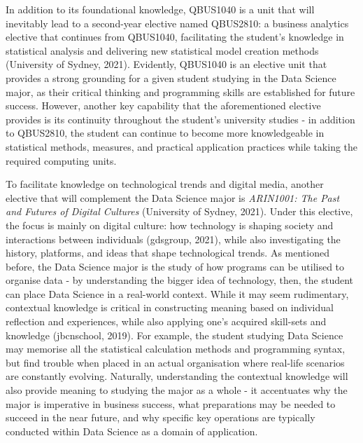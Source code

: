 In addition to its foundational knowledge, QBUS1040 is a unit that will inevitably lead to a second-year elective named QBUS2810: a business analytics elective that continues from QBUS1040, facilitating the student’s knowledge in statistical analysis and delivering new statistical model creation methods (University of Sydney, 2021). Evidently, QBUS1040 is an elective unit that provides a strong grounding for a given student studying in the Data Science major, as their critical thinking and programming skills are established for future success. However, another key capability that the aforementioned elective provides is its continuity throughout the student’s university studies - in addition to QBUS2810, the student can continue to become more knowledgeable in statistical methods, measures, and practical application practices while taking the required computing units. 


To facilitate knowledge on technological trends and digital media, another elective that will complement the Data Science major is \textit{ARIN1001: The Past and Futures of Digital Cultures} (University of Sydney, 2021). Under this elective, the focus is mainly on digital culture: how technology is shaping society and interactions between individuals (gdsgroup, 2021), while also investigating the history, platforms, and ideas that shape technological trends. As mentioned before, the Data Science major is the study of how programs can be utilised to organise data - by understanding the bigger idea of technology, then, the student can place Data Science in a real-world context. While it may seem rudimentary, contextual knowledge is critical in constructing meaning based on individual reflection and experiences, while also applying one’s acquired skill-sets and knowledge (jbcnschool, 2019). For example, the student studying Data Science may memorise all the statistical calculation methods and programming syntax, but find trouble when placed in an actual organisation where real-life scenarios are constantly evolving. Naturally, understanding the contextual knowledge will also provide meaning to studying the major as a whole - it accentuates why the major is imperative in business success, what preparations may be needed to succeed in the near future, and why specific key operations are typically conducted within Data Science as a domain of application.


